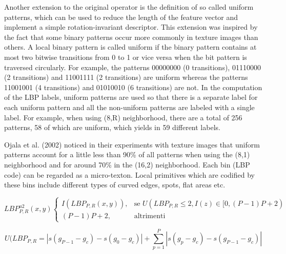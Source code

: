 Another extension to the original operator is the definition of so called uniform patterns, which can be used to reduce the length of the feature vector and implement a simple rotation-invariant descriptor. This extension was inspired by the fact that some binary patterns occur more commonly in texture images than others. A local binary pattern is called uniform if the binary pattern contains at most two bitwise transitions from 0 to 1 or vice versa when the bit pattern is traversed circularly. For example, the patterns 00000000 (0 transitions), 01110000 (2 transitions) and 11001111 (2 transitions) are uniform whereas the patterns 11001001 (4 transitions) and 01010010 (6 transitions) are not. In the computation of the LBP labels, uniform patterns are used so that there is a separate label for each uniform pattern and all the non-uniform patterns are labeled with a single label. For example, when using (8,R) neighborhood, there are a total of 256 patterns, 58 of which are uniform, which yields in 59 different labels.

Ojala et al. (2002) noticed in their experiments with texture images that uniform patterns account for a little less than 90\% of all patterns when using the (8,1) neighborhood and for around 70\% in the (16,2) neighborhood. Each bin (LBP code) can be regarded as a micro-texton. Local primitives which are codified by these bins include different types of curved edges, spots, flat areas etc. 

\begin{equation}
LBP_{P,R}^{u2}(x, y)	
\begin{cases} 
I(LBP_{P,R}(x, y)), & \mbox{se } U(LBP_{P,R} \le 2, I(z) \in [0, (P-1)P+2 )   \\
(P-1)P+2, & \mbox{altrimenti}
\end{cases}
\end{equation}

\begin{equation}
U(LBP_{P,R} = |s( g_{P-1} - g_{c}) - s(g_{0} - g_{c}) | + \sum_{p = 1}^{P} |s(g_{p} - g_{c}) - s( g_{P-1} - g_{c}) |
\end{equation}


